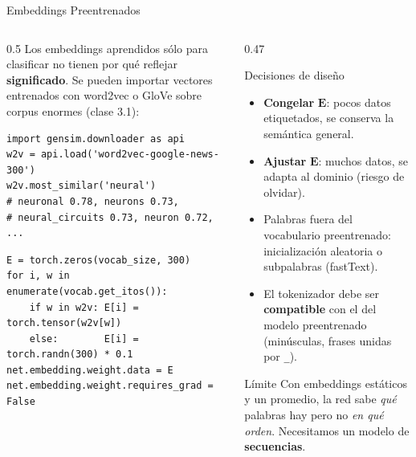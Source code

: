 \documentclass[aspectratio=169, 10pt]{beamer}
\begin{document}
\begin{frame}{Embeddings Preentrenados}

	\begin{columns}[T]
		\begin{column}{0.5\textwidth}
			\small
			Los embeddings aprendidos s\'olo para clasificar no tienen por qu\'e reflejar \textbf{significado}. Se pueden importar vectores entrenados con word2vec o GloVe sobre corpus enormes (clase 3.1):

			\begin{tcolorbox}[codebox]
\scriptsize
\begin{verbatim}
import gensim.downloader as api
w2v = api.load('word2vec-google-news-300')
w2v.most_similar('neural')
# neuronal 0.78, neurons 0.73,
# neural_circuits 0.73, neuron 0.72, ...
\end{verbatim}
			\end{tcolorbox}

			\begin{tcolorbox}[codebox]
\scriptsize
\begin{verbatim}
E = torch.zeros(vocab_size, 300)
for i, w in enumerate(vocab.get_itos()):
    if w in w2v: E[i] = torch.tensor(w2v[w])
    else:        E[i] = torch.randn(300) * 0.1
net.embedding.weight.data = E
net.embedding.weight.requires_grad = False
\end{verbatim}
			\end{tcolorbox}
		\end{column}

		\begin{column}{0.47\textwidth}
			\begin{block}{Decisiones de dise\~no}
				\small
				\begin{itemize}
					\item \textbf{Congelar} $\mathbf{E}$: pocos datos etiquetados, se conserva la sem\'antica general.
					\item \textbf{Ajustar} $\mathbf{E}$: muchos datos, se adapta al dominio (riesgo de olvidar).
					\item Palabras fuera del vocabulario preentrenado: inicializaci\'on aleatoria o subpalabras (fastText).
					\item El tokenizador debe ser \textbf{compatible} con el del modelo preentrenado (min\'usculas, frases unidas por \texttt{\_}).
				\end{itemize}
			\end{block}

			\begin{alertblock}{L\'imite}
				\small
				Con embeddings est\'aticos y un promedio, la red sabe \emph{qu\'e} palabras hay pero no \emph{en qu\'e orden}. Necesitamos un modelo de \textbf{secuencias}.
			\end{alertblock}
		\end{column}
	\end{columns}

\end{frame}
\end{document}
